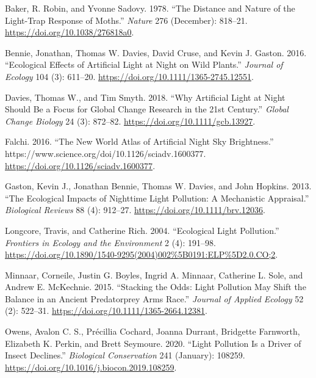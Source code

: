\documentclass[
]{article}
\newlength{\cslhangindent}
\newlength{\cslentryspacingunit} %
\newenvironment{CSLReferences}[2] %
 {%
  \setlength{\parindent}{0pt}
  \ifodd #1
  \let\oldpar\par
  \def\par{\hangindent=\cslhangindent\oldpar}
  \fi
  \setlength{\parskip}{#2\cslentryspacingunit}
 }%
 {}
\begin{document}
\hypertarget{refs}{}
\begin{CSLReferences}{1}{0}
\leavevmode{}%
Baker, R. Robin, and Yvonne Sadovy. 1978. {``The Distance and Nature of
the Light-Trap Response of Moths.''} \emph{Nature} 276 (December):
818--21. \url{https://doi.org/10.1038/276818a0}.

\leavevmode{}%
Bennie, Jonathan, Thomas W. Davies, David Cruse, and Kevin J. Gaston.
2016. {``Ecological Effects of Artificial Light at Night on Wild
Plants.''} \emph{Journal of Ecology} 104 (3): 611--20.
\url{https://doi.org/10.1111/1365-2745.12551}.

\leavevmode{}%
Davies, Thomas W., and Tim Smyth. 2018. {``Why Artificial Light at Night
Should Be a Focus for Global Change Research in the 21st Century.''}
\emph{Global Change Biology} 24 (3): 872--82.
\url{https://doi.org/10.1111/gcb.13927}.

\leavevmode{}%
Falchi. 2016. {``The New World Atlas of Artificial Night Sky
Brightness.''} https://www.science.org/doi/10.1126/sciadv.1600377.
\url{https://doi.org/10.1126/sciadv.1600377}.

\leavevmode{}%
Gaston, Kevin J., Jonathan Bennie, Thomas W. Davies, and John Hopkins.
2013. {``The Ecological Impacts of Nighttime Light Pollution: A
Mechanistic Appraisal.''} \emph{Biological Reviews} 88 (4): 912--27.
\url{https://doi.org/10.1111/brv.12036}.

\leavevmode{}%
Longcore, Travis, and Catherine Rich. 2004. {``Ecological Light
Pollution.''} \emph{Frontiers in Ecology and the Environment} 2 (4):
191--98.
\url{https://doi.org/10.1890/1540-9295(2004)002\%5B0191:ELP\%5D2.0.CO;2}.

\leavevmode{}%
Minnaar, Corneile, Justin G. Boyles, Ingrid A. Minnaar, Catherine L.
Sole, and Andrew E. McKechnie. 2015. {``Stacking the Odds: Light
Pollution May Shift the Balance in an Ancient Predator\textendash prey
Arms Race.''} \emph{Journal of Applied Ecology} 52 (2): 522--31.
\url{https://doi.org/10.1111/1365-2664.12381}.

\leavevmode{}%
Owens, Avalon C. S., Précillia Cochard, Joanna Durrant, Bridgette
Farnworth, Elizabeth K. Perkin, and Brett Seymoure. 2020. {``Light
Pollution Is a Driver of Insect Declines.''} \emph{Biological
Conservation} 241 (January): 108259.
\url{https://doi.org/10.1016/j.biocon.2019.108259}.


\end{CSLReferences}
\end{document}
